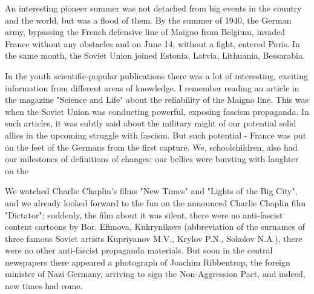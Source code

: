 \label{21-2}
An interesting pioneer summer was not detached from big events in the country and the world, but was a flood of them. By the summer of 1940, the German army, bypassing the French defensive line of Maigno from Belgium, invaded France without any obstacles and on June 14, without a fight, entered Paris. In the same month, the Soviet Union joined Estonia, Latvia, Lithuania, Bessarabia.

\label{21-3}
In the youth scientific-popular publications there was a lot of interesting, exciting information from different areas of knowledge. I remember reading an article in the magazine "Science and Life" about the reliability of the Maigno line. This was when the Soviet Union was conducting powerful, exposing fascism propaganda. In such articles, it was subtly said about the military might of our potential solid allies in the upcoming struggle with fascism. But such potential - France was put on the feet of the Germans from the first capture. We, schoolchildren, also had our milestones of definitions of changes: our bellies were bursting with laughter on the

\label{22-1}
We watched Charlie Chaplin's films "New Times" and "Lights of the Big City", and we already looked forward to the fun on the announced Charlie Chaplin film "Dictator"; suddenly, the film about it was silent, there were no anti-fascist content cartoons by Bor. Efimova, Kukrynikovs (abbreviation of the surnames of three famous Soviet artists Kupriyanov M.V., Krylov P.N., Sokolov N.A.), there were no other anti-fascist propaganda materials. But soon in the central newspapers there appeared a photograph of Joachim Ribbentrop, the foreign minister of Nazi Germany, arriving to sign the Non-Aggression Pact, and indeed, new times had come.